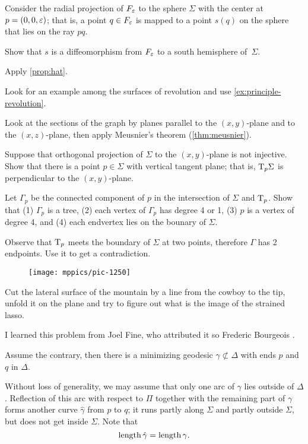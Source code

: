 Consider the radial projection of $F_\varepsilon$ to the sphere $\Sigma$ with the center at $p=(0,0,\varepsilon)$;
that is, a point $q\in F_\varepsilon$ is mapped to a point $s(q)$ on the sphere that lies on the ray $pq$.

Show that $s$ is a diffeomorphism from $F_\varepsilon$ to a south hemisphere of~$\Sigma$.

 Apply \ref{prop:hat}.

 Look for an example among the surfaces of revolution and use \ref{ex:principle-revolution}.

 Look at the sections of the graph by planes parallel to the $(x,y)$-plane and to the $(x,z)$-plane, then apply Meusnier’s theorem (\ref{thm:meusnier}).

Suppose that orthogonal projection of $\Sigma$ to the $(x,y)$-plane is not injective.
Show that there is a point $p\in\Sigma$ with vertical tangent plane;
that is, $\mathrm{T}_p\Sigma$ is perpendicular to the $(x,y)$-plane.

Let $\Gamma_p$ be the connected component of $p$ in the intersection of $\Sigma$ and $\mathrm{T}_p$.
Show that (1) $\Gamma_p$ is a tree, (2) each vertex of $\Gamma_p$ has degree 4 or 1, (3) $p$ is a vertex of degree 4, and (4) each endvertex lies on the bounary of $\Sigma$.

Observe that $\mathrm{T}_p$ meets the boundary of $\Sigma$ at two points,
therefore $\Gamma$ has 2 endpoints.
Use it to get a contradiction.

{

\begin{wrapfigure}{o}{24 mm}
\vskip-8mm
\centering
\texttt{[image: mppics/pic-1250]}
\vskip-0mm
\end{wrapfigure}

 Cut the lateral surface of the mountain by a line from the cowboy to the tip, unfold it on the plane and try to figure out what is the image of the strained lasso.

}

 I learned this problem from Joel Fine, who attributed it so Frederic Bourgeois \cite{fine}.

 Assume the contrary,
then there is a minimizing geodesic $\gamma\not\subset\Delta$ with ends $p$ and $q$ in $\Delta$.

Without loss of generality, we may assume that only one arc of $\gamma$ lies outside of $\Delta$.
Reflection of this arc  with respect to $\Pi$ together with the remaining part of $\gamma$ forms another curve $\hat\gamma$ from $p$ to $q$;
it runs partly along $\Sigma$ 
and partly outside $\Sigma$,
but does not get inside $\Sigma$.
Note that
\[\mathop{\rm length}\nolimits\hat\gamma=\mathop{\rm length}\nolimits\gamma.\]


